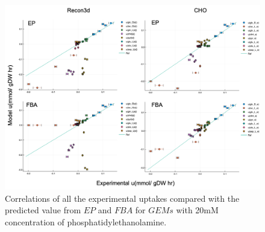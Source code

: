 	\begin{figure}[H]
		\includegraphics[scale = 0.5]{rich_medium_2}
		\caption{Correlations of all the experimental uptakes compared with the predicted value from $EP$ and $FBA$ for $GEMs$ with 20mM concentration of phosphatidylethanolamine.}
		
	\end{figure}

